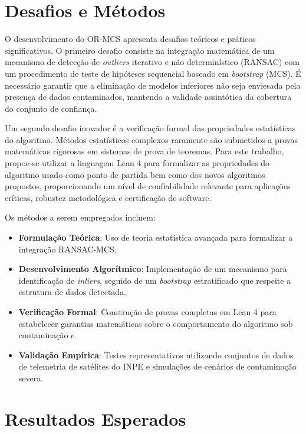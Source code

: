 \documentclass[12pt,a4paper]{article}
\newcommand{\inliers}{\textit{inliers}}
\newcommand{\outliers}{\textit{outliers}}
\begin{document}
\section{Desafios e Métodos}

O desenvolvimento do OR-MCS apresenta desafios teóricos e práticos significativos. O primeiro desafio consiste na integração matemática de um mecanismo de detecção de \outliers{} iterativo e não determinístico (RANSAC) com um procedimento de teste de hipóteses sequencial baseado em \textit{bootstrap} (MCS). É necessário garantir que a eliminação de modelos inferiores não seja enviesada pela presença de dados contaminados, mantendo a validade assintótica da cobertura do conjunto de confiança.

Um segundo desafio inovador é a verificação formal das propriedades estatísticas do algoritmo. Métodos estatísticos complexos raramente são submetidos a provas matemáticas rigorosas em sistemas de prova de teoremas. Para este trabalho, propoe-se utilizar a linguagem Lean 4 para formalizar as propriedades do algoritmo usado como ponto de partida bem como dos novos algoritmos propostos, proporcionando um nível de confiabilidade relevante para aplicações críticas, robustez metodológica e certificação de software.

Os métodos a serem empregados incluem:
\begin{itemize}
  \item \textbf{Formulação Teórica}: Uso de teoria estatística avançada para formalizar a integração RANSAC-MCS.
  \item \textbf{Desenvolvimento Algorítmico}: Implementação de um mecanismo para identificação de \inliers{}, seguido de um \textit{bootstrap} estratificado que respeite a estrutura de dados detectada.
  \item \textbf{Verificação Formal}: Construção de provas completas em Lean 4 para estabelecer garantias matemáticas sobre o comportamento do algoritmo sob contaminação $\epsilon$.
  \item \textbf{Validação Empírica}: Testes representativos utilizando conjuntos de dados de telemetria de satélites do INPE e simulações de cenários de contaminação severa.
\end{itemize}

\section{Resultados Esperados}
\end{document}
